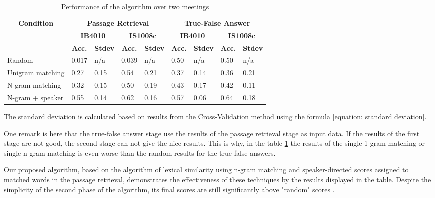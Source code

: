 \begin{table}[htbp]
\caption{Performance of the algorithm over two meetings}
\begin{center}
\begin{tabular}{|l|l|l|l|l|l|l|l|l|}
\hline
\multicolumn{ 1}{|c|}{\textbf{Condition}} & \multicolumn{ 4}{c|}{\textbf{Passage Retrieval}} & \multicolumn{ 4}{c|}{\textbf{True-False Answer}} \\ \cline{ 2- 9}
\multicolumn{ 1}{|c|}{} & \multicolumn{ 2}{c|}{\textbf{IB4010}} & \multicolumn{ 2}{c|}{\textbf{IS1008c}} & \multicolumn{ 2}{c|}{\textbf{IB4010}} & \multicolumn{ 2}{c|}{\textbf{IS1008c}} \\ \cline{ 2- 9}
\multicolumn{ 1}{|c|}{} & \multicolumn{1}{c|}{\textbf{Acc.}} & \multicolumn{1}{c|}{\textbf{Stdev}} & \multicolumn{1}{c|}{\textbf{Acc.}} & \multicolumn{1}{c|}{\textbf{Stdev}} & \multicolumn{1}{c|}{\textbf{Acc.}} & \multicolumn{1}{c|}{\textbf{Stdev}} & \multicolumn{1}{c|}{\textbf{Acc.}} & \multicolumn{1}{c|}{\textbf{Stdev}} \\ \hline
Random & 0.017 & n/a & 0.039 & n/a & 0.50 & n/a & 0.50 & n/a \\ \hline
Unigram matching & 0.27 & 0.15 & 0.54 & 0.21 & 0.37 & 0.14 & 0.36 & 0.21 \\ \hline
N-gram matching & 0.32 & 0.15 & 0.50 & 0.19 & 0.43 & 0.17 & 0.42 & 0.11 \\ \hline
N-gram + speaker & 0.55 & 0.14 & 0.62 & 0.16 & 0.57 & 0.06 & 0.64 & 0.18 \\ \hline
\end{tabular}
\end{center}
\label{Performance of the algorithm over two meetings}
\end{table}


The standard deviation is calculated based on results from the Cross-Validation method using the formula \ref{equation: standard deviation}.

One remark is here that the true-false answer stage use the results of the passage retrieval stage as input data. If the results of the first stage are not good, the second stage can not give the nice results. This is why, in the table \ref{Performance of the algorithm over two meetings} the results of the single 1-gram matching or single n-gram matching is even worse than the random results for the true-false answers.



Our proposed algorithm, based on the algorithm of lexical similarity using n-gram matching and speaker-directed scores assigned to matched words in the passage retrieval, demonstrates the effectiveness of these techniques by the results displayed in the table. Despite the simplicity of the second phase of the algorithm, its final scores are still significantly above "random" scores \cite{lequocanh1}.

